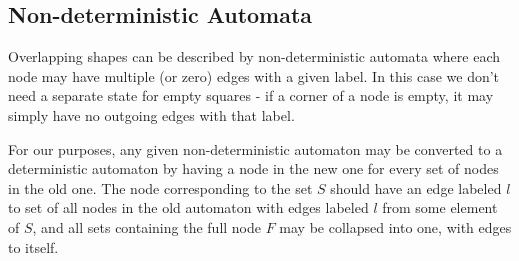 \documentclass{article}
\begin{document}
\subsection{Non-deterministic Automata}
Overlapping shapes can be described by non-deterministic automata where each node may have multiple (or zero) edges with a given label. In this case we don't need a separate state for empty squares - if a corner of a node is empty, it may simply have no outgoing edges with that label.

For our purposes, any given non-deterministic automaton may be converted to a deterministic automaton by having a node in the new one for every set of nodes in the old one. The node corresponding to the set $S$ should have an edge labeled $l$ to set of all nodes in the old automaton with edges labeled $l$ from some element of $S$, and all sets containing the full node $F$ may be collapsed into one, with edges to itself.
\end{document}
